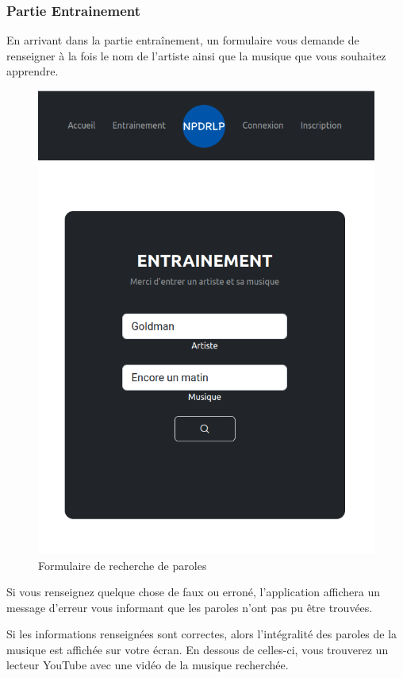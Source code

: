 \documentclass[12pt,french]{article}
\begin{document}
\subsubsection{Partie Entrainement}

En arrivant dans la partie entraînement, un formulaire vous demande de renseigner à la fois le nom de l'artiste ainsi que la musique que vous souhaitez apprendre.

\begin{figure}[H]
	\centering
	\includegraphics[scale=0.25]{rechercheparole.png}
	\caption{Formulaire de recherche de paroles}
\end{figure}

Si vous renseignez quelque chose de faux ou erroné, l'application affichera un message d'erreur vous informant que les paroles n'ont pas pu être trouvées.

Si les informations renseignées sont correctes, alors l'intégralité des paroles de la musique est affichée sur votre écran. En dessous de celles-ci, vous trouverez un lecteur YouTube avec une vidéo de la musique recherchée.
\end{document}
